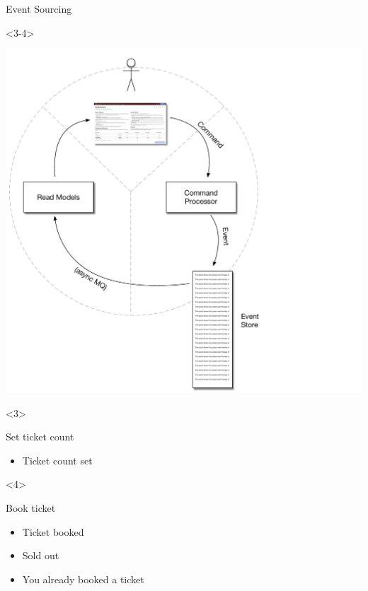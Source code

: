 \begin{frame}[fragile]{Event Sourcing}
\begin{onlyenv}<3-4>
\begin{minipage}{.7\textwidth}
\includegraphics[width=\textwidth]{../EventSourcing3.pdf}
\end{minipage} \hfill
\end{onlyenv}
\begin{onlyenv}<3>
\begin{minipage}{0.25\textwidth}
\small
Set ticket count
\begin{itemize}
\item Ticket count set
\end{itemize}
\end{minipage}
\end{onlyenv}
\begin{onlyenv}<4>
\begin{minipage}{0.25\textwidth}
\small
Book ticket
\begin{itemize}
\item Ticket booked
\item Sold out
\item You already booked a ticket
\end{itemize}
\end{minipage}
\end{onlyenv}


\end{frame}
